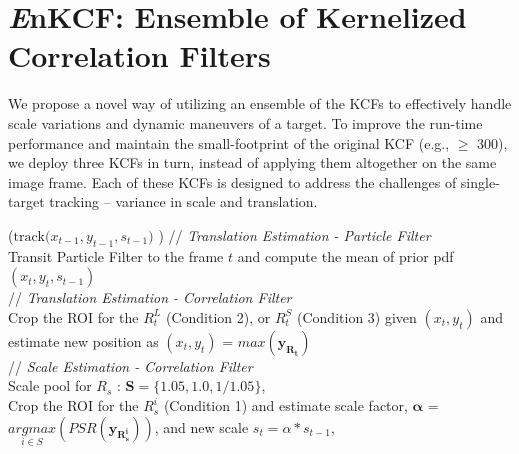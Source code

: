\documentclass[10pt,twocolumn,letterpaper]{article}
\begin{document}
\section{{\it E}nKCF: Ensemble of Kernelized Correlation Filters}
We propose a novel way of utilizing an ensemble of the KCFs
\cite{henriques2015high} to effectively handle scale variations and
dynamic maneuvers of a target. To improve the run-time performance and
maintain the small-footprint of the original KCF (e.g., $\ge$ 300), we
deploy three KCFs in turn, instead of applying them altogether on the
same image frame. Each of these KCFs is designed to address the
challenges of single-target tracking -- variance in scale and
translation.

\begin{algorithm*}[h]
\small
\DontPrintSemicolon
{}
\Begin($\text{track($x_{t-1},y_{t-1},s_{t-1}$) }$)
{
 	// \textit{Translation Estimation - Particle Filter} \\
	Transit Particle Filter to the frame $t$ and compute the mean of prior pdf $(x_{t},y_{t},s_{t-1})$ \\
     // \textit{Translation Estimation - Correlation Filter} \\
	Crop the ROI for the $R_{t}^{L}$ (Condition 2), or $R_{t}^{S}$ (Condition 3) given $(x_{t},y_{t})$ and estimate new position as $(x_{t},y_{t})$ = $\mathbf{\textit{max}(y_{R_{t}})}$\\
	// \textit{Scale Estimation - Correlation Filter}\\
	Scale pool for $R_{s}$ : $\mathbf{S} = \lbrace1.05,1.0,1/1.05\rbrace$,\\
	Crop the ROI for the $R_{s}^{i}$ (Condition 1) and estimate scale factor, $\mathbf{\alpha}$ = $\underset{i\in S}{\textit{argmax}}(PSR(\boldsymbol{y_{R_{s}^{i}}}))$, and new scale $s_{t} = \alpha * s_{t-1}$,\\ 
}
\end{algorithm*}
\end{document}
